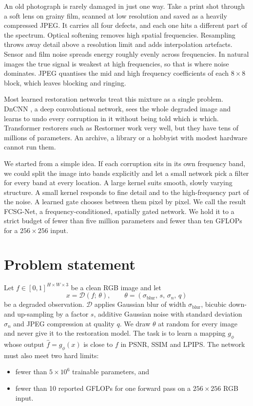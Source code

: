 \documentclass[12pt,a4paper,oneside]{NITR}
\newcommand{\fcsg}{FCSG-Net}
\begin{document}
An old photograph is rarely damaged in just one way. Take a print shot
through a soft lens on grainy film, scanned at low resolution and saved as a
heavily compressed JPEG. It carries all four defects, and each one hits a
different part of the spectrum. Optical softening removes high spatial
frequencies. Resampling throws away detail above a resolution limit and adds
interpolation artefacts. Sensor and film noise spreads energy roughly evenly
across frequencies. In natural images the true signal is weakest at high
frequencies, so that is where noise dominates. JPEG quantises the mid and
high frequency coefficients of each $8\times8$ block, which leaves blocking
and ringing.

Most learned restoration networks treat this mixture as a single problem.
DnCNN \cite{zhang2017dncnn}, a deep convolutional network, sees the whole
degraded image and learns to undo every corruption in it without being told
which is which. Transformer restorers such as Restormer
\cite{zamir2022restormer} work very well, but they have tens of millions of
parameters. An archive, a library or a hobbyist with modest hardware cannot
run them.

We started from a simple idea. If each corruption sits in its own frequency
band, we could split the image into bands explicitly and let a small network
pick a filter for every band at every location. A large kernel suits smooth,
slowly varying structure. A small kernel responds to fine detail and to the
high-frequency part of the noise. A learned gate chooses between them pixel
by pixel. We call the result \fcsg{}, a frequency-conditioned, spatially
gated network. We hold it to a strict budget of fewer than five million
parameters and fewer than ten GFLOPs for a $256\times256$ input.

\section{Problem statement}\label{sec:problem}

Let $f \in [0,1]^{H\times W\times3}$ be a clean RGB image and let
\begin{equation}
	x = \mathcal{D}(f;\, \theta), \qquad
	\theta = (\sigma_\text{blur},\, s,\, \sigma_n,\, q)
	\label{eq:degradation}
\end{equation}
be a degraded observation. $\mathcal{D}$ applies Gaussian blur of width
$\sigma_\text{blur}$, bicubic down- and up-sampling by a factor $s$, additive
Gaussian noise with standard deviation $\sigma_n$ and JPEG compression at
quality $q$. We draw $\theta$ at random for every image and never give it to
the restoration model. The task is to learn a mapping $g_\phi$ whose output
$\hat f = g_\phi(x)$ is close to $f$ in PSNR, SSIM and LPIPS. The network
must also meet two hard limits:
\begin{itemize}
	\item fewer than $5\times10^{6}$ trainable parameters, and
	\item fewer than 10 reported GFLOPs for one forward pass on a
	$256\times256$ RGB input.
\end{itemize}
\end{document}
